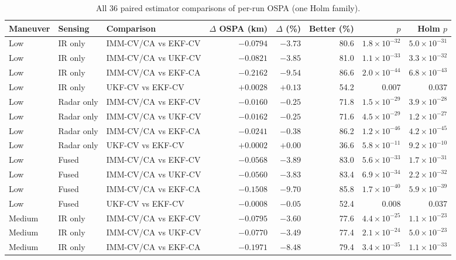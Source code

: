 \begin{table}[!htbp]
\caption{All 36 paired estimator comparisons of per-run OSPA (one Holm family).}
\label{tab:S4}
\centering\footnotesize\setlength{\tabcolsep}{4pt}
\begin{tabular}{@{}lllrrrrr@{}}
\toprule
Maneuver & Sensing & Comparison & $\Delta$ OSPA (km) & $\Delta$ (\%) & Better (\%) & $p$ & Holm $p$ \\
\midrule
Low & IR only & IMM-CV/CA vs EKF-CV & $-0.0794$ & $-3.73$ & 80.6 & $1.8\times10^{-32}$ & $5.0\times10^{-31}$ \\
Low & IR only & IMM-CV/CA vs UKF-CV & $-0.0821$ & $-3.85$ & 81.0 & $1.1\times10^{-33}$ & $3.3\times10^{-32}$ \\
Low & IR only & IMM-CV/CA vs EKF-CA & $-0.2162$ & $-9.54$ & 86.6 & $2.0\times10^{-44}$ & $6.8\times10^{-43}$ \\
Low & IR only & UKF-CV vs EKF-CV & $+0.0028$ & $+0.13$ & 54.2 & 0.007 & 0.037 \\
\addlinespace[2pt]
Low & Radar only & IMM-CV/CA vs EKF-CV & $-0.0160$ & $-0.25$ & 71.8 & $1.5\times10^{-29}$ & $3.9\times10^{-28}$ \\
Low & Radar only & IMM-CV/CA vs UKF-CV & $-0.0162$ & $-0.25$ & 71.6 & $4.5\times10^{-29}$ & $1.2\times10^{-27}$ \\
Low & Radar only & IMM-CV/CA vs EKF-CA & $-0.0241$ & $-0.38$ & 86.2 & $1.2\times10^{-46}$ & $4.2\times10^{-45}$ \\
Low & Radar only & UKF-CV vs EKF-CV & $+0.0002$ & $+0.00$ & 36.6 & $5.8\times10^{-11}$ & $9.2\times10^{-10}$ \\
\addlinespace[2pt]
Low & Fused & IMM-CV/CA vs EKF-CV & $-0.0568$ & $-3.89$ & 83.0 & $5.6\times10^{-33}$ & $1.7\times10^{-31}$ \\
Low & Fused & IMM-CV/CA vs UKF-CV & $-0.0560$ & $-3.83$ & 83.4 & $6.9\times10^{-34}$ & $2.2\times10^{-32}$ \\
Low & Fused & IMM-CV/CA vs EKF-CA & $-0.1508$ & $-9.70$ & 85.8 & $1.7\times10^{-40}$ & $5.9\times10^{-39}$ \\
Low & Fused & UKF-CV vs EKF-CV & $-0.0008$ & $-0.05$ & 52.4 & 0.008 & 0.037 \\
\addlinespace[2pt]
\midrule
Medium & IR only & IMM-CV/CA vs EKF-CV & $-0.0795$ & $-3.60$ & 77.6 & $4.4\times10^{-25}$ & $1.1\times10^{-23}$ \\
Medium & IR only & IMM-CV/CA vs UKF-CV & $-0.0770$ & $-3.49$ & 77.4 & $2.1\times10^{-24}$ & $5.0\times10^{-23}$ \\
Medium & IR only & IMM-CV/CA vs EKF-CA & $-0.1971$ & $-8.48$ & 79.4 & $3.4\times10^{-35}$ & $1.1\times10^{-33}$ \\

\end{tabular}
\end{table}
